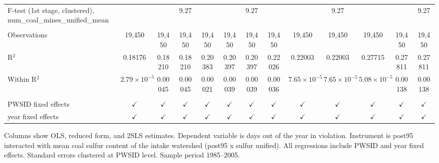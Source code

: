 \begin{table}[htbp]
\begin{adjustbox}{width = \textwidth, center}
\begin{tabular}{lcccccccccccc}
         F-test (1st stage, clustered), num\_coal\_mines\_unified\_mean     &                       &               & 9.27          &               &               & 9.27          &               &                       & 9.27                  &                       &               & 9.27\\  
         
          \\
         
         Observations                                                       & 19,450                & 19,450        & 19,450        & 19,450        & 19,450        & 19,450        & 19,450        & 19,450                & 19,450                & 19,450                & 19,450        & 19,450\\  
         R$^2$                                                              & 0.18176               & 0.18210       & 0.18210       & 0.20383       & 0.20397       & 0.20397       & 0.22026       & 0.22003               & 0.22003               & 0.27715               & 0.27811       & 0.27811\\  
         Within R$^2$                                                       & $2.79\times 10^{-5}$  & 0.00045       & 0.00045       & 0.00021       & 0.00039       & 0.00039       & 0.00036       & $7.65\times 10^{-5}$  & $7.65\times 10^{-5}$  & $5.08\times 10^{-5}$  & 0.00138       & 0.00138\\  
         
          \\
         
         PWSID fixed effects                                                & $\checkmark$          & $\checkmark$  & $\checkmark$  & $\checkmark$  & $\checkmark$  & $\checkmark$  & $\checkmark$  & $\checkmark$          & $\checkmark$          & $\checkmark$          & $\checkmark$  & $\checkmark$\\   
         year fixed effects                                                 & $\checkmark$          & $\checkmark$  & $\checkmark$  & $\checkmark$  & $\checkmark$  & $\checkmark$  & $\checkmark$  & $\checkmark$          & $\checkmark$          & $\checkmark$          & $\checkmark$  & $\checkmark$\\   
         
         \bottomrule
         
      \end{tabular}
      
      
      
   \end{adjustbox}
      {\tiny\linespread{1}\selectfont \par \raggedright 
   Columns show OLS, reduced form, and 2SLS estimates. Dependent variable is days out of the year in violation. Instrument is post95 interacted with mean coal sulfur content of the intake watershed (post95 x sulfur unified). All regressions include PWSID and year fixed effects. Standard errors clustered at PWSID level. Sample period 1985--2005.}
   
\end{table}


